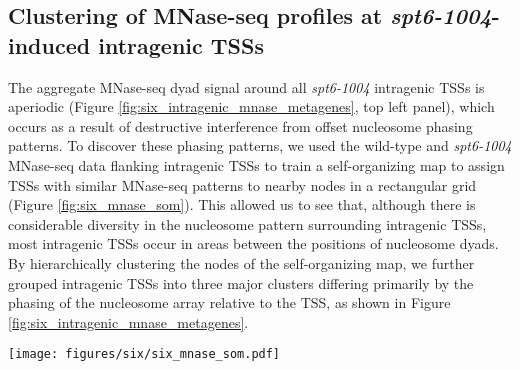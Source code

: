 \subsection{Clustering of MNase-seq profiles at \textit{spt6-1004}-induced intragenic TSSs}

The aggregate MNase-seq dyad signal around all \textit{spt6-1004} intragenic TSSs is aperiodic (Figure \ref{fig:six_intragenic_mnase_metagenes}, top left panel), which occurs as a result of destructive interference from offset nucleosome phasing patterns.
To discover these phasing patterns, we used the wild-type and \textit{spt6-1004} MNase-seq data flanking intragenic TSSs to train a self-organizing map to assign TSSs with similar MNase-seq patterns to nearby nodes in a rectangular grid (Figure \ref{fig:six_mnase_som}).
This allowed us to see that, although there is considerable diversity in the nucleosome pattern surrounding intragenic TSSs, most intragenic TSSs occur in areas between the positions of nucleosome dyads.
By hierarchically clustering the nodes of the self-organizing map, we further grouped intragenic TSSs into three major clusters differing primarily by the phasing of the nucleosome array relative to the TSS, as shown in Figure \ref{fig:six_intragenic_mnase_metagenes}.

\begin{sidewaysfigure}
    \centering
    \texttt{[image: figures/six/six\_mnase\_som.pdf]}
    \caption[Average MNase-seq dyad signal around all \textit{spt6-1004}-induced intragenic TSSs, grouped by a self-organizing map of the MNase-seq signal.]{Average MNase-seq dyad signal around all \textit{spt6-1004}-induced intragenic TSSs, grouped by assignment to nodes of a 6x8 super-organizing map (SOM). The number of TSSs assigned to each node is shown in the upper right of each panel, and is shaded by the node's assignment to a cluster determined by agglomerative hierarchical clustering of the nodes. The solid line and shading are the median and inter-quartile range of the mean spike-in normalized coverage over two replicates (\textit{spt6-1004}) or one experiment (wild-type), in non-overlapping 5 bp bins.}
    \label{fig:six_mnase_som}
\end{sidewaysfigure}

